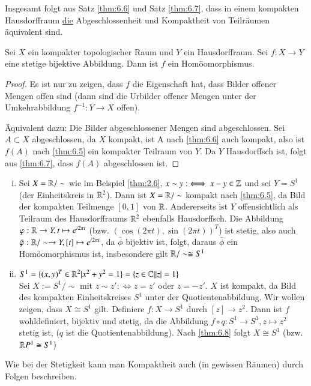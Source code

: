 \documentclass[a4paper,10pt]{scrartcl}
\newcommand{\homo}{\cong}
\begin{document}
Insgesamt folgt aus Satz \ref{thm:6.6} und Satz \ref{thm:6.7}, dass in einem kompakten Hausdorffraum \underline{die} Abgeschlossenheit und Kompaktheit von Teilräumen äquivalent sind.
\begin{st}\label{thm:6.8}
 Sei $X$ ein kompakter topologischer Raum und $Y$ ein Hausdorffraum. Sei $f: X\to Y$ eine stetige bijektive Abbildung. Dann ist $f$ ein Homöomorphismus.
\end{st}
\begin{proof}
 Es ist nur zu zeigen, dass $f$ die Eigenschaft hat, dass Bilder offener Mengen offen sind (dann sind die Urbilder offener Mengen unter der Umkehrabbildung $f^{-1}:Y\to X$ offen).

Äquivalent dazu: Die Bilder abgeschlossener Mengen sind abgeschlossen. Sei $A\subset X$ abgeschlossen, da $X$ kompakt, ist A nach \ref{thm:6.6} auch kompakt, also ist $f(A)$ nach  \ref{thm:6.5}  ein kompakter Teilraum von $Y$. Da $Y$ Hausdorffsch ist, folgt aus \ref{thm:6.7}, dass $f(A)$ abgeschlossen ist.
\end{proof}
\begin{ex*}
 \begin{enumerate}[(i)]
  \item Sei $X=\mathbb{R}/\sim$ wie im Beispiel \ref{thm:2.6}, $x\sim y:\iff x-y\in \mathbb{Z}$ und sei $Y=S^1$ (der Einheitskreis in $\mathbb{R}^2$). Dann ist $X=\mathbb{R}/\sim$ kompakt nach \ref{thm:6.5}, da Bild der kompakten Teilmenge $[0,1]$ von $\mathbb{R}$. Andererseits ist $Y$ offensichtlich als Teilraum des Hausdorffraums $\mathbb{R}^2$ ebenfalls Hausdorffsch. Die Abbildung $\varphi: \mathbb{R}\to Y, t\mapsto e^{i2\pi t}$ (bzw. $(\cos(2\pi t), \sin(2\pi t))^T$) ist stetig, also auch $\bar {\varphi}: \mathbb{R}/\sim \to Y, [t]\mapsto e^{i2\pi t}$, da $\bar \phi$ bijektiv ist, folgt, daraus $\bar \phi$ ein Homöomorphismus ist, insbesondere gilt $\R/\sim \homo S^1$

 \item $S^1=\{(x,y)^T\in \mathbb{R}^2|x^2+y^2=1\}=\{z\in \mathbb{C}||z|=1\}$\\

 Sei $X:=S^1/\sim$ mit $z\sim z':\iff z=z'$ oder $z=-z'$. $X$ ist kompakt, da Bild des kompakten Einheitskreises $S^1$ unter der Quotientenabbildung. Wir wollen zeigen, dass $X\homo S^{1}$ gilt. Definiere $f:X\to S^1$ durch $[z]\to z^2$. Dann ist $f$ wohldefiniert, bijektiv und stetig, da die Abbildung $ f \circ q : S^1 \to S^1, z \mapsto z^2 $ stetig
ist, ($q$ ist die Quotientenabbildung). Nach \ref{thm:6.8} folgt $X\homo S^1$ (bzw. $\R P^1\homo S^1$)
\end{enumerate}
Wie bei der Stetigkeit kann man Kompaktheit auch (in gewissen Räumen) durch Folgen beschreiben.
\end{ex*}
\end{document}
